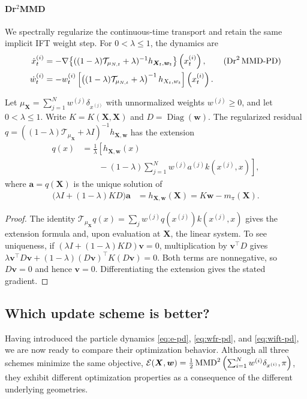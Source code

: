 \paragraph{Dr$^2$MMD} 
We spectrally regularize the continuous-time transport and retain the same implicit IFT weight step. For $0<\lambda\leq1$, the dynamics are
\begin{align*}\label{eq:dr2-mmd-pd}
    \dot{x}_t^{(i)}&=-\nabla \big\{ ((1-\lambda) \calT_{\mu_{N, t}} + \lambda)^{-1} h_{\bm{X}_t,\bm{w}_t} \big\} \left(x_t^{(i)}\right), \tag{$\mathrm{Dr}^{2}\,\mathrm{MMD}$-PD} \\
    \dot{w}_t^{(i)} &=  - w_t^{(i)} \left[\left((1-\lambda) \mathcal{T}_{\mu_{N, t}} + \lambda \right)^{-1} h_{X_t, w_t} \right]\left(x_t^{(i)}\right).
\end{align*}


\begin{lem}\label{lem:dr2-mmd-implementation}
Let $\mu_{\bm X}=\sum_{j=1}^Nw^{(j)}\delta_{x^{(j)}}$ with unnormalized weights $w^{(j)}\geq0$, and let $0<\lambda\leq1$. Write $K=K(\bm X,\bm X)$ and $D=\operatorname{Diag}(\bm w)$. The regularized residual $q=((1-\lambda)\mathcal T_{\mu_{\bm X}}+\lambda I)^{-1}h_{\bm X,\bm w}$ has the extension
\begin{align*}
q(x)&=\frac{1}{\lambda}\left[h_{\bm X,\bm w}(x)\right.\\
&\qquad\left.{}-(1-\lambda)\sum_{j=1}^Nw^{(j)}a^{(j)}k(x^{(j)},x)\right],
\end{align*}
where $\bm a=q(\bm X)$ is the unique solution of
\begin{align*}
\bigl(\lambda I+(1-\lambda)KD\bigr)\bm a
&=h_{\bm X,\bm w}(\bm X)=K\bm w-m_\pi(\bm X).
\end{align*}
\end{lem}

\begin{proof}
The identity $\mathcal T_{\mu_{\bm X}}q(x)=\sum_jw^{(j)}q(x^{(j)})k(x^{(j)},x)$ gives the extension formula and, upon evaluation at $\bm X$, the linear system. To see uniqueness, if $(\lambda I+(1-\lambda)KD)\bm v=0$, multiplication by $\bm v^\top D$ gives $\lambda\bm v^\top D\bm v+(1-\lambda)(D\bm v)^\top K(D\bm v)=0$. Both terms are nonnegative, so $D\bm v=0$ and hence $\bm v=0$. Differentiating the extension gives the stated gradient.
\end{proof}

\subsection{Which update scheme is better?}
Having introduced the particle dynamics \eqref{eq:e-pd}, \eqref{eq:wfr-pd}, and \eqref{eq:wift-pd}, we are now ready to compare their optimization behavior. Although all three schemes minimize the same objective, $\mathcal{E}(\bm{X},\bm{w}) = \frac{1}{2}\operatorname{MMD}^2\left(\sum_{i=1}^N w^{(i)}\delta_{x^{(i)}},\pi \right)$, they exhibit different optimization properties as a consequence of the different underlying geometries.

